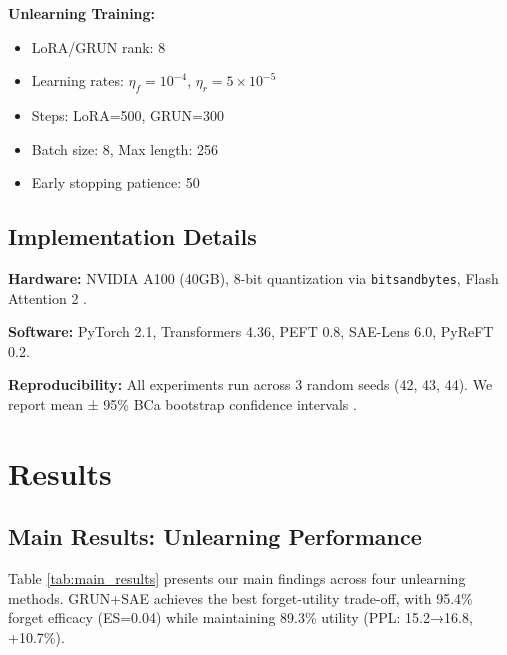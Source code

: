 \documentclass[11pt]{article}
\begin{document}
\textbf{Unlearning Training:}
\begin{itemize}
    \item LoRA/GRUN rank: 8
    \item Learning rates: $\eta_f = 10^{-4}$, $\eta_r = 5 \times 10^{-5}$
    \item Steps: LoRA=500, GRUN=300
    \item Batch size: 8, Max length: 256
    \item Early stopping patience: 50
\end{itemize}

\subsection{Implementation Details}

\textbf{Hardware:} NVIDIA A100 (40GB), 8-bit quantization via \texttt{bitsandbytes}, Flash Attention 2 \cite{dao2023flashattention}.

\textbf{Software:} PyTorch 2.1, Transformers 4.36, PEFT 0.8, SAE-Lens 6.0, PyReFT 0.2.

\textbf{Reproducibility:} All experiments run across 3 random seeds (42, 43, 44). We report mean ± 95\% BCa bootstrap confidence intervals \cite{efron1987better}.

\section{Results}

\subsection{Main Results: Unlearning Performance}

Table \ref{tab:main_results} presents our main findings across four unlearning methods. GRUN+SAE achieves the best forget-utility trade-off, with 95.4\% forget efficacy (ES=0.04) while maintaining 89.3\% utility (PPL: 15.2→16.8, +10.7\%).
\end{document}
